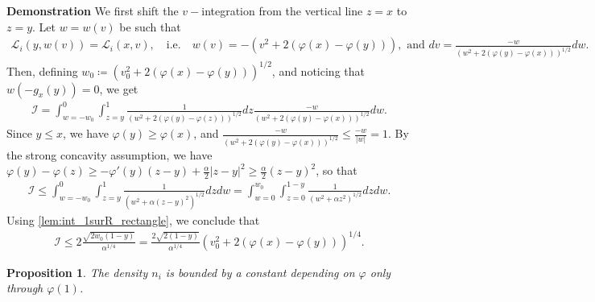 \documentclass{article}
\newtheorem{proposition}{Proposition}[section]
\numberwithin{equation}{section}
\newcommand{\myproof}[1]{
	\noindent \textbf{Demonstration}
	{\small	#1 \hfill \qedsymbol}
}
\begin{document}
\myproof{
	We first shift the $v-$integration from the vertical line $z=x$ to $z=y$. Let $w = w(v)$ be such that
	\begin{align*}
		\mathcal{L}_i(y,w(v)) = \mathcal{L}_i(x,v), \quad \text{i.e.} \quad w(v) = -\left(v^2 + 2 \left(\varphi(x) - \varphi(y)\right)\right), \text{ and } dv = \frac{-w}{\left(w^2 + 2 \left(\varphi(y) - \varphi(x)\right)\right)^{1/2}}  dw.
	\end{align*}
	Then, defining $w_0 \coloneqq \left(v_0^2 + 2 \left(\varphi(x) - \varphi(y)\right)\right)^{1/2}$, and noticing that $w(-g_x(y)) = 0$, we get
	\begin{align*}
		\mathcal{I} = \int_{w=-w_0}^{0} \int_{z=y}^{1} \frac{1}{\left(w^2 + 2 \left(\varphi(y) - \varphi(z)\right)\right)^{1/2}} dz \frac{-w}{\left(w^2 + 2 \left(\varphi(y) - \varphi(x)\right)\right)^{1/2}} dw.
	\end{align*}
	Since $y \leqslant x$, we have $\varphi(y) \geqslant \varphi(x)$, and $\frac{-w}{\left(w^2 + 2 \left(\varphi(y) - \varphi(x)\right)\right)^{1/2}} \leqslant \frac{-w}{|w|} = 1$. By the strong concavity assumption, we have $\varphi(y) - \varphi(z) \geqslant - \varphi'(y) (z - y) + \frac{\alpha}{2} |z - y|^2 \geqslant \frac{\alpha}{2} (z - y)^2$, so that
	\begin{align*}
		\mathcal{I} \leqslant \int_{w=-w_0}^{0} \int_{z=y}^{1} \frac{1}{\left(w^2 + \alpha (z- y)^2\right)^{1/2}} dz dw = \int_{w=0}^{w_0} \int_{z=0}^{1-y} \frac{1}{\left(w^2 + \alpha z^2\right)^{1/2}} dz dw.
	\end{align*}
	Using \cref{lem:int_1surR_rectangle}, we conclude that 
	\begin{align*}
		\mathcal{I} \leqslant 2 \frac{\sqrt{2 w_0 (1-y)}}{\alpha^{1/4}} = \frac{2\sqrt{2(1-y)}}{\alpha^{1/4}} \left(v_0^2 + 2 \left(\varphi(x) - \varphi(y)\right)\right)^{1/4}.
	\end{align*}
}

\begin{proposition}
	The density $n_i$ is bounded by a constant depending on $\varphi$ only through $\varphi(1)$.
\end{proposition}
\end{document}
